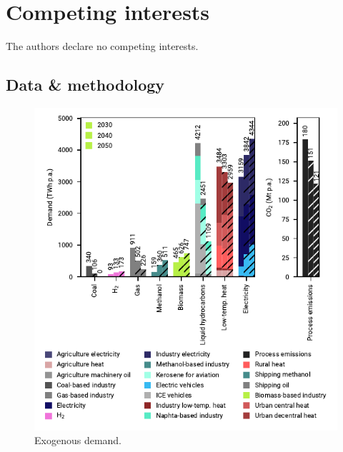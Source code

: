 \documentclass[pdflatex,sn-nature]{sn-jnl}%
\theoremstyle{thmstyleone}%
\theoremstyle{thmstyletwo}%
\theoremstyle{thmstylethree}%
\begin{document}
\section*{Competing interests}
The authors declare no competing interests.

\clearpage
\begin{appendices}

\section{Data \& methodology}\label{app:data_methodology}

\begin{figure}[htbp]
  \centering
  \includegraphics{figures/exogenous_demand}
  \caption{Exogenous demand.}
  \label{fig:exogenous_demand}
\end{figure}


\end{appendices}
\end{document}
